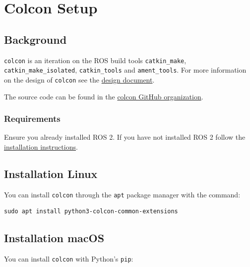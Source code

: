 
\section{Colcon Setup}
\label{sec:colcon-setup}

\subsection{Background}

\texttt{colcon} is an iteration on the ROS build tools \texttt{catkin\_make}, \texttt{catkin\_make\_isolated}, \texttt{catkin\_tools} and \texttt{ament\_tools}. For more information on the design of \texttt{colcon} see the \href{https://design.ros2.org/articles/build_tool.html}{design document}.

The source code can be found in the \href{https://github.com/colcon}{colcon GitHub organization}.

\subsubsection{Requirements}

Ensure you already installed ROS 2. If you have not installed ROS 2 follow the \href{https://docs.ros.org/en/humble/Installation.html}{installation instructions}.

\subsection{Installation Linux}

You can install \texttt{colcon} through the \texttt{apt} package manager with the command:

\begin{verbatim}
sudo apt install python3-colcon-common-extensions
\end{verbatim}

\subsection{Installation macOS}

You can install \texttt{colcon} with Python's \texttt{pip}:

